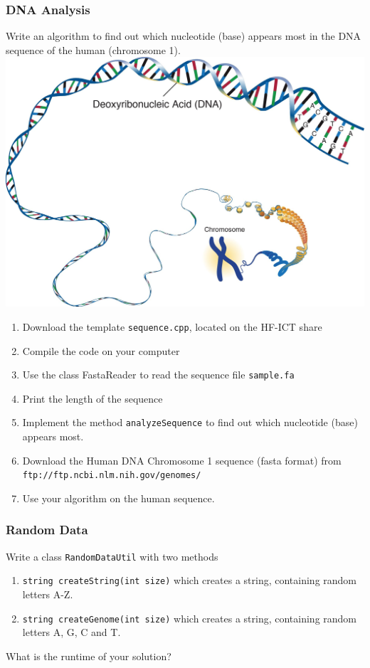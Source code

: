 \begin{frame}[fragile]
\frametitle{DNA Analysis}
{\tiny
\begin{exercise}
Write an algorithm to find out which nucleotide (base) appears most in the DNA
sequence of the human (chromosome 1).\\
\includegraphics[scale=0.3]{img/dna.jpg}
\begin{enumerate}
\item Download the template \verb|sequence.cpp|, located on the HF-ICT share
\item Compile the code on your computer
\item Use the class FastaReader to read the sequence file \verb|sample.fa|
\item Print the length of the sequence
\item Implement the method \verb|analyzeSequence| to find out which nucleotide (base)
appears most.
\item Download the Human DNA Chromosome 1 sequence (fasta format) from
\verb|ftp://ftp.ncbi.nlm.nih.gov/genomes/|
\item Use your algorithm on the human sequence.
\end{enumerate}

\end{exercise}
}

\end{frame}

\begin{frame}[fragile]
\frametitle{Random Data}
\begin{exercise}
Write a class \verb|RandomDataUtil| with two methods
\begin{enumerate}
\item \verb|string createString(int size)| which creates a string, containing
random letters A-Z.
\item \verb|string createGenome(int size)| which creates a string, containing
random letters A, G, C and T.
\end{enumerate}
What is the runtime of your solution?
\end{exercise}

\end{frame}

